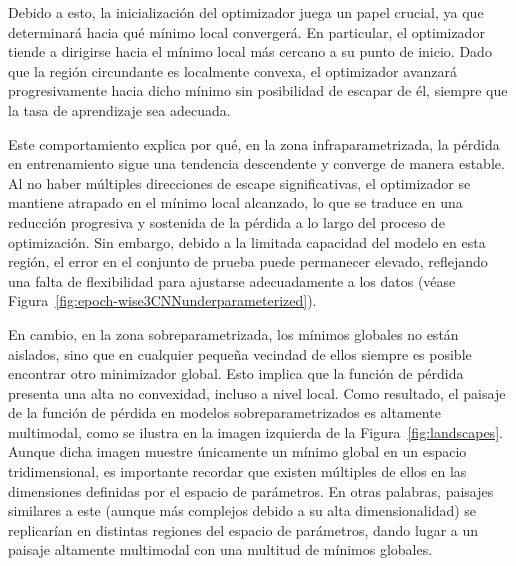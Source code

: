 Debido a esto, la inicialización del optimizador juega un papel crucial, ya que determinará hacia qué mínimo local convergerá. En particular, el optimizador tiende a dirigirse hacia el mínimo local más cercano a su punto de inicio. Dado que la región circundante es localmente convexa, el optimizador avanzará progresivamente hacia dicho mínimo sin posibilidad de escapar de él, siempre que la tasa de aprendizaje sea adecuada.\newline

Este comportamiento explica por qué, en la zona infraparametrizada, la pérdida en entrenamiento sigue una tendencia descendente y converge de manera estable. Al no haber múltiples direcciones de escape significativas, el optimizador se mantiene atrapado en el mínimo local alcanzado, lo que se traduce en una reducción progresiva y sostenida de la pérdida a lo largo del proceso de optimización. Sin embargo, debido a la limitada capacidad del modelo en esta región, el error en el conjunto de prueba puede permanecer elevado, reflejando una falta de flexibilidad para ajustarse adecuadamente a los datos (véase Figura~\ref{fig:epoch-wise3CNNunderparameterized}).\newline

En cambio, en la zona sobreparametrizada, los mínimos globales no están aislados, sino que en cualquier pequeña vecindad de ellos siempre es posible encontrar otro minimizador global. Esto implica que la función de pérdida presenta una alta no convexidad, incluso a nivel local. Como resultado, el paisaje de la función de pérdida en modelos sobreparametrizados es altamente multimodal, como se ilustra en la imagen izquierda de la Figura~\ref{fig:landscapes}. Aunque dicha imagen muestre únicamente un mínimo global en un espacio tridimensional, es importante recordar que existen múltiples de ellos en las dimensiones definidas por el espacio de parámetros. En otras palabras, paisajes similares a este (aunque más complejos debido a su alta dimensionalidad) se replicarían en distintas regiones del espacio de parámetros, dando lugar a un paisaje altamente multimodal con una multitud de mínimos globales.\newline 

